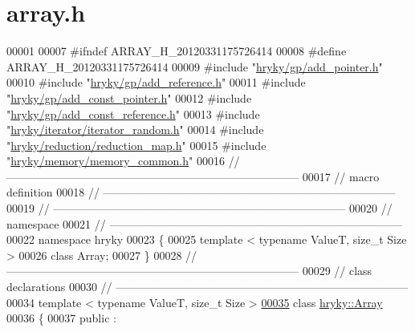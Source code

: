 \hypertarget{array_8h_source}{\section{array.\-h}
}

\begin{DoxyCode}
00001 
00007 \textcolor{preprocessor}{#ifndef ARRAY\_H\_20120331175726414}
00008 \textcolor{preprocessor}{}\textcolor{preprocessor}{#define ARRAY\_H\_20120331175726414}
00009 \textcolor{preprocessor}{}\textcolor{preprocessor}{#include "\hyperlink{add__pointer_8h}{hryky/gp/add_pointer.h}"}
00010 \textcolor{preprocessor}{#include "\hyperlink{add__reference_8h}{hryky/gp/add_reference.h}"}
00011 \textcolor{preprocessor}{#include "\hyperlink{add__const__pointer_8h}{hryky/gp/add_const_pointer.h}"}
00012 \textcolor{preprocessor}{#include "\hyperlink{add__const__reference_8h}{hryky/gp/add_const_reference.h}"}
00013 \textcolor{preprocessor}{#include "\hyperlink{iterator__random_8h}{hryky/iterator/iterator_random.h}"}
00014 \textcolor{preprocessor}{#include "\hyperlink{reduction__map_8h}{hryky/reduction/reduction_map.h}"}
00015 \textcolor{preprocessor}{#include "\hyperlink{memory__common_8h}{hryky/memory/memory_common.h}"}
00016 \textcolor{comment}{//
      ------------------------------------------------------------------------------}
00017 \textcolor{comment}{// macro definition}
00018 \textcolor{comment}{//
      ------------------------------------------------------------------------------}
00019 \textcolor{comment}{//
      ------------------------------------------------------------------------------}
00020 \textcolor{comment}{// namespace}
00021 \textcolor{comment}{//
      ------------------------------------------------------------------------------}
00022 \textcolor{keyword}{namespace }hryky
00023 \{
00025     \textcolor{keyword}{template} < \textcolor{keyword}{typename} ValueT, \textcolor{keywordtype}{size\_t} Size >
00026     \textcolor{keyword}{class }Array;
00027 \}
00028 \textcolor{comment}{//
      ------------------------------------------------------------------------------}
00029 \textcolor{comment}{// class declarations}
00030 \textcolor{comment}{//
      ------------------------------------------------------------------------------}
00034 \textcolor{comment}{}\textcolor{keyword}{template} < \textcolor{keyword}{typename} ValueT, \textcolor{keywordtype}{size\_t} Size >
\hypertarget{array_8h_source_l00035}{}\hyperlink{classhryky_1_1_array}{00035} \textcolor{keyword}{class }\hyperlink{classhryky_1_1_array}{hryky::Array}
00036 \{
00037 \textcolor{keyword}{public} :

\end{DoxyCode}
